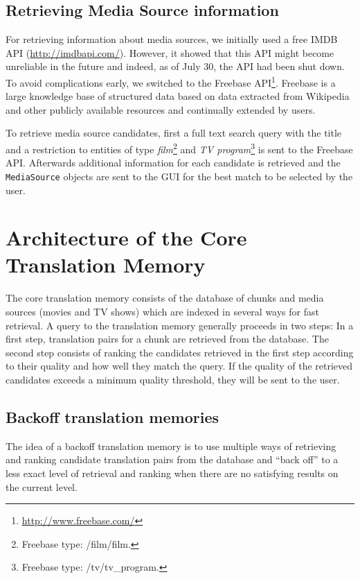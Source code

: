 \subsection{Retrieving Media Source information}

For retrieving information about media sources, we initially used a free IMDB API (\url{http://imdbapi.com/}). However, it showed that this API might become unreliable in the future and indeed, as of July 30, the API had been shut down. To avoid complications early, we switched to the Freebase API\footnote{\url{http://www.freebase.com/}}. Freebase is a large knowledge base of structured data based on data extracted from Wikipedia and other publicly available resources and continually extended by users.

To retrieve media source candidates, first a full text search query with the title and a restriction to entities of type \emph{film}\footnote{Freebase type: /film/film.} and \emph{TV program}\footnote{Freebase type: /tv/tv\_program.} is sent to the Freebase API. Afterwards additional information for each candidate is retrieved and the {\tt MediaSource} objects are sent to the GUI for the best match to be selected by the user.



\section{Architecture of the Core Translation Memory}
\label{sec:corearchitecture}

The core translation memory consists of the database of chunks and media
sources (movies and TV shows) which are indexed in several ways for fast
retrieval. A query to the translation memory generally proceeds in two
steps: In a first step, translation pairs for a chunk are retrieved from
the database. The second step consists of ranking the candidates
retrieved in the first step according to their quality and how well they
match the query. If the quality of the retrieved candidates exceeds a
minimum quality threshold, they will be sent to the user.

\subsection{Backoff translation memories}

The idea of a backoff translation memory is to use multiple ways of
retrieving and ranking candidate translation pairs from the database and
``back off'' to a less exact level of retrieval and ranking when there
are no satisfying results on the current level.

